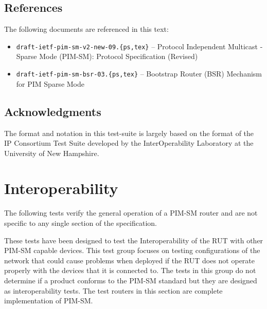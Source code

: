 \documentclass[11pt]{report}
\begin{document}
\section{References}
\label{sec:references}

The following documents are referenced in this text:

\begin{itemize}

 \item \verb=draft-ietf-pim-sm-v2-new-09.{ps,tex}= -- Protocol Independent
		  Multicast - Sparse Mode (PIM-SM): Protocol Specification
		  (Revised)

 \item \verb=draft-ietf-pim-sm-bsr-03.{ps,tex}= -- Bootstrap Router (BSR)
		  Mechanism for PIM Sparse Mode

\end{itemize}


\section{Acknowledgments}
The format and notation in this test-suite is largely based on the format of
the IP Consortium Test Suite developed by the InterOperability Laboratory at
the University of New Hampshire.

%
%
\renewcommand{\chaptername}{Test Group}
\newcommand{\para}[1]{\vspace{1ex}\noindent{\large\bf #1}}
\newcommand{\subpara}[1]{\vspace{1ex}\noindent\emph{#1}}

\chapter{Interoperability}

\para{Scope:}
The following tests verify the general operation of a PIM-SM router and are
not specific to any single section of the specification.

\para{Overview:}
These tests have been designed to test the Interoperability of the RUT with
other PIM-SM capable devices. This test group focuses on testing
configurations of the network that could cause problems when deployed if the
RUT does not operate properly with the devices that it is connected to. The
tests in this group do not determine if a product conforms to the PIM-SM
standard but they are designed as interoperability tests. The test routers in
this section are complete implementation of PIM-SM.
\end{document}
